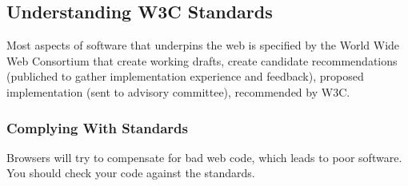 \subsection{Understanding W3C Standards}\label{sub:understanding_w3c_standards}

Most aspects of software that underpins the web is specified by the World Wide Web Consortium that create working drafts, create candidate recommendations (publiched to gather implementation experience and feedback), proposed implementation (sent to advisory committee), recommended by W3C.

\subsubsection{Complying With Standards}\label{ssub:complying_with_standards}

Browsers will try to compensate for bad web code, which leads to poor software.
You should check your code against the standards.

